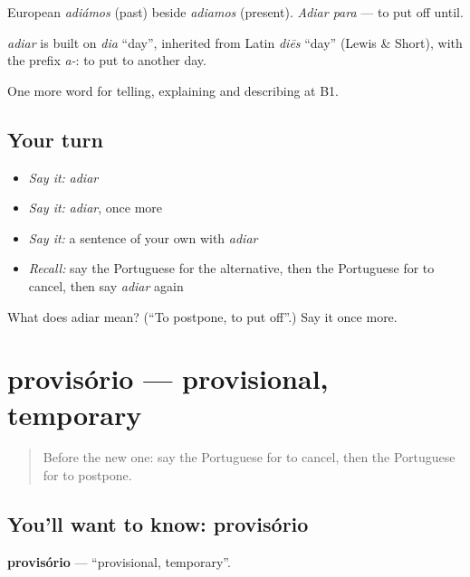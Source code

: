 European \emph{adiámos} (past) beside \emph{adiamos} (present). \emph{Adiar para} — to put off until.

\begin{cousinweb}
\emph{adiar} is built on \emph{dia} \textquotedblleft{}day\textquotedblright{}, inherited from Latin \emph{diēs} \textquotedblleft{}day\textquotedblright{} (Lewis \& Short), with the prefix \emph{a-}: to put to another day.
\end{cousinweb}

\begin{grammarlens}[title={What you've built}]
One more word for telling, explaining and describing at B1.
\end{grammarlens}

\subsection*{Your turn}
\begin{itemize}
\raggedright
  \item \emph{Say it:} \emph{adiar}
  \item \emph{Say it:} \emph{adiar}, once more
  \item \emph{Say it:} a sentence of your own with \emph{adiar}
  \item \emph{Recall:} say the Portuguese for the alternative, then the Portuguese for to cancel, then say \emph{adiar} again
\end{itemize}

\begin{tcolorbox}[breakable,colback=teal!4,colframe=teal!35!black,title={Before you move on}]
What does adiar mean? (\textquotedblleft{}To postpone, to put off\textquotedblright{}.) Say it once more.
\end{tcolorbox}
\section[provisório]{provisório — provisional, temporary}

\label{lesson:PT-C372-provisorio}



\begin{quote}
Before the new one: say the Portuguese for to cancel, then the Portuguese for to postpone.
\end{quote}

\subsection*{You'll want to know: provisório}
\textbf{provisório} — \textquotedblleft{}provisional, temporary\textquotedblright{}.

